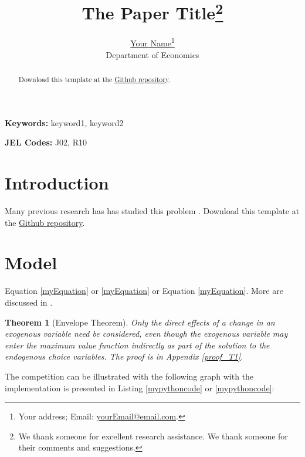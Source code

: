 \documentclass[letterpaper]{article}
\title{The Paper Title\thanks{We thank someone for excellent research assistance. We thank someone for their comments and suggestions.}}
\author{\href{}{Your Name}\thanks{Your address; Email: \href{mailto:yourEmail@email.com}{yourEmail@email.com}.}\\
Department of Economics}
\date{\the\year{}}
\newtheorem{theorem}{Theorem}
\begin{document}
\maketitle

\doublespacing

\begin{abstract}
  \onehalfspacing
  \lipsum[3] Download this template at the \href{https://github.com/howardhsumail/Paper-LaTeX-Template.git}{Github repository}.
\end{abstract}
\bigskip\bigskip

\providecommand{\key}[1]{\textbf{Keywords:} #1}
\key{keyword1, keyword2}

\providecommand{\jel}[2]{\textbf{JEL Codes:} #1}
\jel{J02, R10}

\newpage
\section{Introduction}
\lipsum[4-5] Many previous research has has studied this problem \citep{Lee2018, DS2018}. Download this template at the \href{https://github.com/howardhsumail/Paper-LaTeX-Template.git}{Github repository}.

\section{Model}
Equation \ref{myEquation} or \cref{myEquation} or Equation \eqref{myEquation}. \lipsum[105-106] More are discussed in .

\begin{theorem}[Envelope Theorem]
  \onehalfspacing
  Only the direct effects of a change in an exogenous variable need be considered, even though the exogenous variable may enter the maximum value function indirectly as part of the solution to the endogenous choice variables. The proof is in Appendix \ref{proof_T1}.
\end{theorem}

The {\color{mycolor}competition} can be illustrated with the following graph with the implementation is presented in Listing \ref{mypythoncode} or \cref{mypythoncode}:
\end{document}
